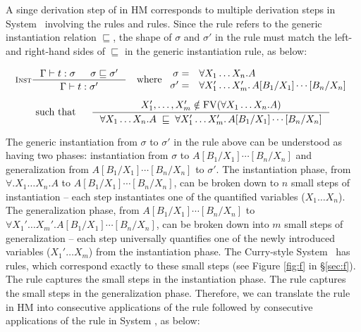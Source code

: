 A singe derivation step of  in HM corresponds to
multiple derivation steps in System \F\ involving
the rules  and  rules.
Since the  rule refers to the generic instantiation relation
$\sqsubseteq$, the shape of $\sigma$ and $\sigma'$ in the  rule
must match the left- and right-hand sides of $\sqsubseteq$
in the generic instantiation rule, as below:
\begin{singlespace}
\begin{multline*}
  \inference[\sc Inst]{\Gamma |- t : \sigma & \sigma \sqsubseteq \sigma'}
                      {\Gamma |- t : \sigma'}
        \quad\text{where}~
        \begin{array}{rl}
                \sigma =& \forall X_1\dots X_n.A ~~~~~~~~~~~~~~~~~~~~~~ \\
               \sigma' =& \forall X_1'\dots X_m'.\,A[B_1/X_1]\cdots[B_n/X_n]
        \end{array}
	\\ \text{such that} ~ \phantom{\frac{\frac{A}{\frac{A}{A}}}{A}}
   \inference{X_1',\dots,X_m'\notin\FV(\forall X_1\dots X_n.A)}
             {\forall X_1\dots X_n.A \;\sqsubseteq\;
              \forall X_1'\dots X_m'.\,A[B_1/X_1]\cdots[B_n/X_n]}
\end{multline*}
\end{singlespace}
The generic instantiation from $\sigma$ to $\sigma'$
in the  rule above can be understood as having two phases:
instantiation from $\sigma$ to $A[B_1/X_1]\cdots[B_n/X_n]$ and
generalization from $A[B_1/X_1]\cdots[B_n/X_n]$ to $\sigma'$.
The instantiation phase, from $\forall.X_1\dots X_n.A$ to $A[B_1/X_1]\cdots[B_n/X_n]$,
can be broken down to $n$ small steps of instantiation --
each step instantiates one of the quantified variables ($X_1\dots X_n$).
The generalization phase, from $A[B_1/X_1]\cdots[B_n/X_n]$ to
$\forall X_1'\dots X_m'.A[B_1/X_1]\cdots[B_n/X_n]$, can be broken down into
$m$ small steps of generalization -- each step universally quantifies one
of the newly introduced variables ($X_1'\dots X_m$) from the instantiation phase.
The Curry-style System \F\ has rules, which correspond exactly to these 
small steps (see Figure \ref{fig:f} in \S\ref{sec:f}).
The  rule captures the small steps in the instantiation phase.
The  rule captures the small steps in the generalization phase.
Therefore, we can translate the  rule in HM into
consecutive applications of the  rule followed by
consecutive applications of the  rule in System \F, as below:

